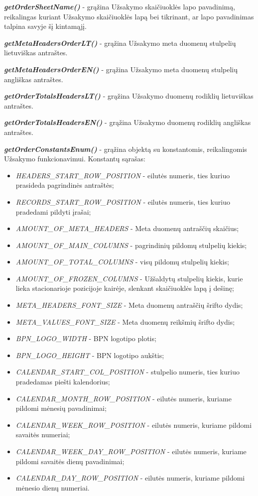 \textit{\textbf{getOrderSheetName()}} - grąžina Užsakymo skaičiuoklės lapo pavadinimą, reikalingas kuriant Užsakymo skaičiuoklės lapą bei tikrinant, ar lapo pavadinimas talpina savyje šį kintamąjį. 

\textit{\textbf{getMetaHeadersOrderLT()}} - grąžina Užsakymo meta duomenų stulpelių lietuviškas antraštes. 

\textit{\textbf{getMetaHeadersOrderEN()}} - grąžina Užsakymo meta duomenų stulpelių angliškas antraštes.  

\textit{\textbf{getOrderTotalsHeadersLT()}} - grąžina Užsakymo duomenų rodiklių lietuviškas antraštes. 

\textit{\textbf{getOrderTotalsHeadersEN()}} - grąžina Užsakymo duomenų rodiklių angliškas antraštes. 

\textit{\textbf{getOrderConstantsEnum()}} - grąžina objektą su konstantomis, reikalingomis Užsakymo funkcionavimui. Konstantų sąrašas:
\begin{itemize}
    \itemsep0em 
    \item \textit{HEADERS\_START\_ROW\_POSITION} - eilutės numeris, ties kuriuo prasideda pagrindinės antraštės;
    \item \textit{RECORDS\_START\_ROW\_POSITION} - eilutės numeris, ties kuriuo pradedami pildyti įrašai;
    \item \textit{AMOUNT\_OF\_META\_HEADERS} - Meta duomenų antraščių skaičius;
    \item \textit{AMOUNT\_OF\_MAIN\_COLUMNS} - pagrindinių pildomų stulpelių kiekis;
    \item \textit{AMOUNT\_OF\_TOTAL\_COLUMNS} - visų pildomų stulpelių kiekis;
    \item \textit{AMOUNT\_OF\_FROZEN\_COLUMNS} - Užšaldytų stulpelių kiekis, kurie lieka stacionarioje pozicijoje kairėje, slenkant skaičiuoklės lapą į dešinę;
    \item \textit{META\_HEADERS\_FONT\_SIZE} - Meta duomenų antraščių šrifto dydis;
    \item \textit{META\_VALUES\_FONT\_SIZE} - Meta duomenų reikšmių šrifto dydis;
    \item \textit{BPN\_LOGO\_WIDTH} - BPN logotipo plotis;
    \item \textit{BPN\_LOGO\_HEIGHT} - BPN logotipo aukštis;
    \item \textit{CALENDAR\_START\_COL\_POSITION} - stulpelio numeris, ties kuriuo pradedamas piešti kalendorius;
    \item \textit{CALENDAR\_MONTH\_ROW\_POSITION} - eilutės numeris, kuriame pildomi mėnesių pavadinimai;
    \item \textit{CALENDAR\_WEEK\_ROW\_POSITION} - eilutės numeris, kuriame pildomi savaitės numeriai;
    \item \textit{CALENDAR\_WEEK\_DAY\_ROW\_POSITION} - eilutės numeris, kuriame pildomi savaitės dienų pavadinimai;
    \item \textit{CALENDAR\_DAY\_ROW\_POSITION} - eilutės numeris, kuriame pildomi mėnesio dienų numeriai.
\end{itemize} 

